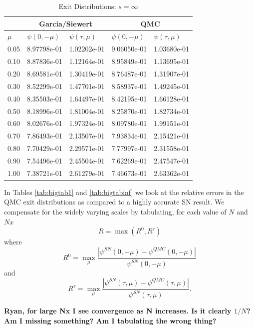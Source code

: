 \begin{table}[h]
\centering
\caption{Exit Distributions: $s = \infty$}
\label{tab:cesinf}
\begin{tabular}{lllll}
 & \multicolumn{2}{c}{Garcia/Siewert}
 & \multicolumn{2}{c}{QMC}\\
\hline
$\mu$ &$\psi(0, -\mu)$ &$\psi(\tau, \mu)$ &$\psi(0, -\mu)$ &$\psi(\tau, \mu)$ \\
\hline
0.05 &    8.97798e-01 &    1.02202e-01 &    9.06050e-01 &    1.03680e-01   \\ 
 0.10 &    8.87836e-01 &    1.12164e-01 &    8.95849e-01 &    1.13695e-01   \\ 
 0.20 &    8.69581e-01 &    1.30419e-01 &    8.76487e-01 &    1.31907e-01   \\ 
 0.30 &    8.52299e-01 &    1.47701e-01 &    8.58937e-01 &    1.49245e-01   \\ 
 0.40 &    8.35503e-01 &    1.64497e-01 &    8.42195e-01 &    1.66128e-01   \\ 
 0.50 &    8.18996e-01 &    1.81004e-01 &    8.25870e-01 &    1.82734e-01   \\ 
 0.60 &    8.02676e-01 &    1.97324e-01 &    8.09780e-01 &    1.99151e-01   \\ 
 0.70 &    7.86493e-01 &    2.13507e-01 &    7.93834e-01 &    2.15421e-01   \\ 
 0.80 &    7.70429e-01 &    2.29571e-01 &    7.77997e-01 &    2.31558e-01   \\ 
 0.90 &    7.54496e-01 &    2.45504e-01 &    7.62269e-01 &    2.47547e-01   \\ 
 1.00 &    7.38721e-01 &    2.61279e-01 &    7.46673e-01 &    2.63362e-01   \\ 
\hline
\end{tabular}
\end{table}

In Tables \ref{tab:bigtab1} and \ref{tab:bigtabinf} we look at the
relative errors in the QMC exit distributions as compared to a highly
accurate SN result. We compensate for the widely varying scales by tabulating,
for each value of $N$ and $Nx$
\[
R = \max(R^0, R^\tau)
\]
where
\[
R^0 = \max_\mu
\frac{ | \psi^{SN}(0,-\mu) - \psi^{QMC}(0,-\mu) | }{\psi^{SN}(0,-\mu) }
\]
and
\[
R^\tau = \max_\mu
\frac{ | \psi^{SN}(\tau,\mu) - \psi^{QMC}(\tau,\mu) | }{\psi^{SN}(\tau,\mu) }.
\]

{\bf Ryan, for large Nx I see convergence as N increases. Is it clearly
$1/N$? Am I missing something? Am I tabulating the wrong thing?}

